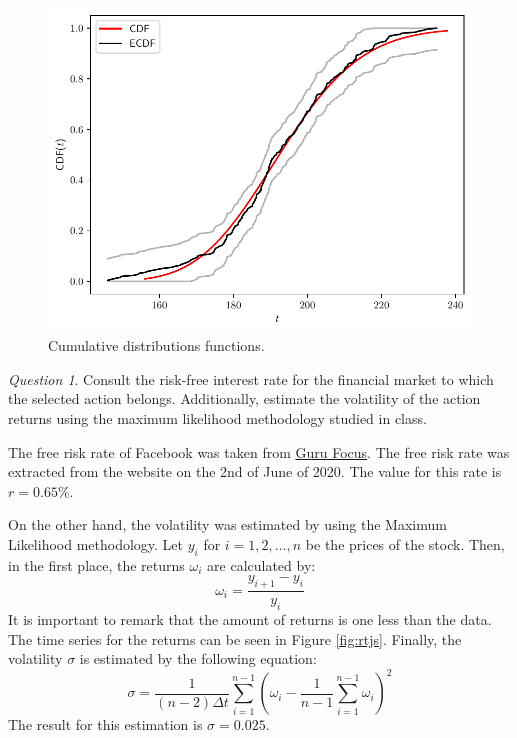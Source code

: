 \documentclass[11pt]{article}
\theoremstyle{definition}
\theoremstyle{remark}
\theoremstyle{remark}
\newtheorem{question}{Question}
\begin{document}
\begin{figure}[H]
    \centering
    \includegraphics[scale=0.5]{../plts/ecdf.pdf}
    \caption{Cumulative distributions functions.}
    \label{fig:ecdfs}
\end{figure}

\begin{question}
  Consult the risk-free interest rate for the financial market to which the
  selected action belongs. Additionally, estimate the volatility of the action
  returns using the maximum likelihood methodology studied in class.
\end{question}

The free risk rate of Facebook was taken from \href{https://bit.ly/30yrDY4}{Guru
  Focus}. The free risk rate was extracted from the website on the 2nd of June
of 2020. The value for this rate is $r = 0.65\%$.

On the other hand, the volatility was estimated by using the Maximum Likelihood
methodology. Let $y_{i}$ for $i = 1, 2, \ldots, n$ be the prices of the stock.
Then, in the first place, the returns $\omega_{i}$ are calculated by:
\begin{equation*}
  \omega_{i} = \frac{y_{i + 1} - y_{i}}{y_{i}}
\end{equation*}
It is important to remark that the amount of returns is one less than the data.
The time series for the returns can be seen in Figure \ref{fig:rtjs}. Finally,
the volatility $\sigma$ is estimated by the following equation:
\begin{equation*}
  \sigma = \frac{1}{(n - 2) \Delta t} \sum_{i = 1}^{n - 1}\left(\omega_{i} -
    \frac{1}{n - 1}\sum_{i=1}^{n - 1} \omega_{i}\right)^{2}
\end{equation*}
The result for this estimation is $\sigma = 0.025$.
\end{document}
